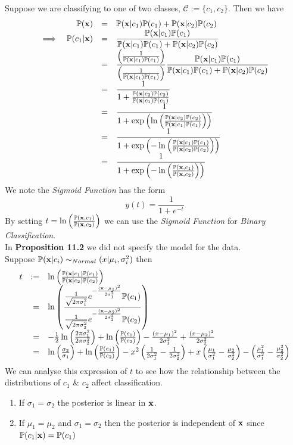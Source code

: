 \documentclass[11pt,a4paper]{article}
\begin{document}
Suppose we are classifying to one of two classes, \ie $\mathcal{C}:=\{c_1,c_2\}$. Then we have
\[\begin{array}{rrcl}
&\mathbb{P}(\textbf{x})&=&\mathbb{P}(\textbf{x}|c_1)\mathbb{P}(c_1)+\mathbb{P}(\textbf{x}|c_2)\mathbb{P}(c_2)\\
\implies&\mathbb{P}(c_1|\textbf{x})&=&\dfrac{\mathbb{P}(\textbf{x}|c_1)\mathbb{P}(c_1)}{\mathbb{P}(\textbf{x}|c_1)\mathbb{P}(c_1)+\mathbb{P}(\textbf{x}|c_2)\mathbb{P}(c_2)}\\
&&=&\dfrac{\left(\frac{1}{\mathbb{P}(\textbf{x}|c_1)\mathbb{P}(c_1)}\right)}{\left(\frac{1}{\mathbb{P}(\textbf{x}|c_1)\mathbb{P}(c_1)}\right)}\dfrac{\mathbb{P}(\textbf{x}|c_1)\mathbb{P}(c_1)}{\mathbb{P}(\textbf{x}|c_1)\mathbb{P}(c_1)+\mathbb{P}(\textbf{x}|c_2)\mathbb{P}(c_2)}\\
&&=&\dfrac{1}{1+\frac{\mathbb{P}(\textbf{x}|c_2)\mathbb{P}(c_2)}{\mathbb{P}(\textbf{x}|c_1)\mathbb{P}(c_1)}}\\
&&=&\dfrac{1}{1+\text{exp}\left(\ln\left(\frac{\mathbb{P}(\textbf{x}|c_2)\mathbb{P}(c_2)}{\mathbb{P}(\textbf{x}|c_1)\mathbb{P}(c_1)}\right)\right)}\\
&&=&\dfrac{1}{1+\text{exp}\left(-\ln\left(\frac{\mathbb{P}(\textbf{x}|c_1)\mathbb{P}(c_1)}{\mathbb{P}(\textbf{x}|c_2)\mathbb{P}(c_2)}\right)\right)}\\
&&=&\dfrac{1}{1+\text{exp}\left(-\ln\left(\frac{\mathbb{P}(\textbf{x},c_1)}{\mathbb{P}(\textbf{x},c_2)}\right)\right)}
\end{array}\]
We note the \textit{Sigmoid Function} has the form
$$y(t)=\frac{1}{1+e^{-t}}$$
By setting $t=\ln\left(\frac{\mathbb{P}(\textbf{x},c_1)}{\mathbb{P}(\textbf{x},c_2)}\right)$ we can use the \textit{Sigmoid Function} for \textit{Binary Classification}.\\

In \textbf{Proposition 11.2} we did not specify the model for the data.\\
Suppose $\mathbb{P}(\textbf{x}|c_i)\sim_{Normal}(x|\mu_i,\sigma^2_i)$ then
\[\begin{array}{rrl}
t&:=&\ln\left(\frac{\mathbb{P}(\textbf{x}|c_1)\mathbb{P}(c_1)}{\mathbb{P}(\textbf{x}|c_2)\mathbb{P}(c_2)}\right)\\
&=&{\displaystyle\ln\left(\frac{\frac{1}{\sqrt{2\pi\sigma^2_1}}e^{-\frac{(\textbf{x}-\mu_1)^2}{2\sigma^2_1}}\mathbb{P}(c_1)}{\frac{1}{\sqrt{2\pi\sigma^2_2}}e^{-\frac{(\textbf{x}-\mu_2)^2}{2\sigma^2_2}}\mathbb{P}(c_2)}\right)}\\
&=&-\frac{1}{2}\ln\left(\frac{2\pi\sigma^2_1}{2\pi\sigma^2_2}\right)+\ln\left(\frac{\mathbb{P}(c_1)}{\mathbb{P}(c_2)}\right)-\frac{(x-\mu_1)^2}{2\sigma^2_1}+\frac{(x-\mu_2)^2}{2\sigma^2_2}\\
&=&\ln\left(\frac{\sigma_2}{\sigma_1}\right)+\ln\left(\frac{\mathbb{P}(c_1)}{\mathbb{P}(c_2)}\right)-x^2\left(\frac{1}{2\sigma_1^2}-\frac{1}{2\sigma_2^2}\right)+x\left(\frac{\mu_1}{\sigma_1^2}-\frac{\mu_2}{\sigma^2_2}\right)-\left(\frac{\mu_1^2}{\sigma_1^2}-\frac{\mu_2^2}{\sigma^2_2}\right)
\end{array}\]
We can analyse this expression of $t$ to see how the relationship between the distributions of $c_1$ \& $c_2$ affect classification.
\begin{enumerate}
	\item If $\sigma_1=\sigma_2$ the posterior is linear in $\textbf{x}$.
	\item If $\mu_1=\mu_2$ and $\sigma_1=\sigma_2$ then the posterior is independent of $\textbf{x}$ since $\mathbb{P}(c_1|\textbf{x})=\mathbb{P}(c_1)$
\end{enumerate}
\end{document}
